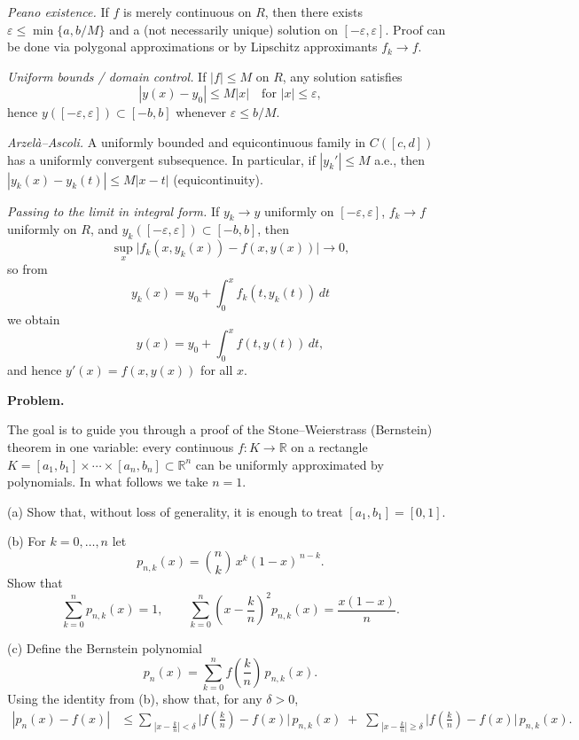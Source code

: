 \documentclass[12pt,a4paper]{article}
\begin{document}
\medskip
\emph{Peano existence.}
If $f$ is merely continuous on $R$, then there exists
$\varepsilon\le \min\{a,b/M\}$ and a (not necessarily unique) solution on $[-\varepsilon,\varepsilon]$.
Proof can be done via polygonal approximations or by Lipschitz approximants $f_k\to f$.

\medskip
\emph{Uniform bounds / domain control.}
If $|f|\le M$ on $R$, any solution satisfies
\[
|y(x)-y_0|\le M|x| \quad \text{for } |x|\le \varepsilon,
\]
hence $y([-\varepsilon,\varepsilon])\subset[-b,b]$ whenever $\varepsilon\le b/M$.

\medskip
\emph{Arzel\`a--Ascoli.}
A uniformly bounded and equicontinuous family in $C([c,d])$ has a uniformly convergent subsequence.
In particular, if $|y_k'|\le M$ a.e., then $|y_k(x)-y_k(t)|\le M|x-t|$ (equicontinuity).

\medskip
\emph{Passing to the limit in integral form.}
If $y_k\to y$ uniformly on $[-\varepsilon,\varepsilon]$, $f_k\to f$ uniformly on $R$,
and $y_k([- \varepsilon,\varepsilon])\subset[-b,b]$, then
\[
\sup_{x}\big|f_k(x,y_k(x))-f(x,y(x))\big|\to0,
\]
so from
\[
y_k(x)=y_0+\int_0^x f_k(t,y_k(t))\,dt
\]
we obtain
\[
y(x)=y_0+\int_0^x f(t,y(t))\,dt,
\]
and hence $y'(x)=f(x,y(x))$ for all $x$.

\textbf{Problem.}

The goal is to guide you through a proof of the Stone–Weierstrass (Bernstein) theorem in one variable:
every continuous $f:K\to\mathbb R$ on a rectangle
$K=[a_1,b_1]\times\cdots\times[a_n,b_n]\subset\mathbb R^n$
can be uniformly approximated by polynomials.
In what follows we take $n=1$.

\medskip
(a)\; Show that, without loss of generality, it is enough to treat $[a_1,b_1]=[0,1]$.

\medskip
(b)\; For $k=0,\dots,n$ let
\[
p_{n,k}(x)=\binom{n}{k}\,x^{k}(1-x)^{\,n-k}.
\]
Show that
\[
\sum_{k=0}^{n} p_{n,k}(x)=1,
\qquad
\sum_{k=0}^{n}\!\left(x-\frac{k}{n}\right)^{\!2} p_{n,k}(x)=\frac{x(1-x)}{n}.
\]

\medskip
(c)\; Define the Bernstein polynomial
\[
p_n(x)=\sum_{k=0}^{n} f\!\left(\frac{k}{n}\right)\,p_{n,k}(x).
\]
Using the identity from (b), show that, for any $\delta>0$,
\[
\begin{aligned}
	|p_n(x)-f(x)|
	&\le
	\sum_{\;|x-\frac{k}{n}|<\delta} \bigl|f(\tfrac{k}{n})-f(x)\bigr|\,p_{n,k}(x)
	\;+\;
	\sum_{\;|x-\frac{k}{n}|\ge \delta} \bigl|f(\tfrac{k}{n})-f(x)\bigr|\,p_{n,k}(x).
\end{aligned}
\]
\end{document}

